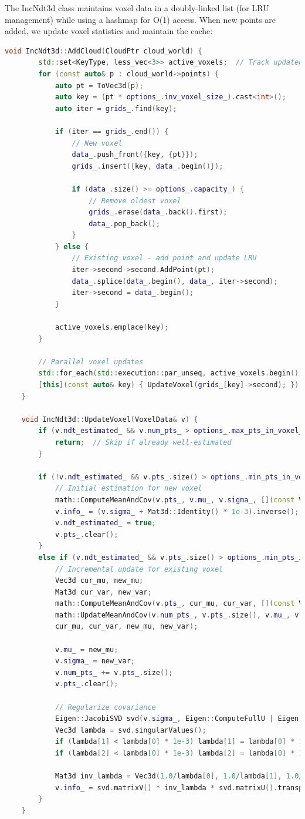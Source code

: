 The IncNdt3d class maintains voxel data in a doubly-linked list (for LRU management) while using a hashmap for O(1) access. When new points are added, we update voxel statistics and maintain the cache:

\begin{lstlisting}[language=c++,caption=src/ch7/ndt\_inc.cc]
	void IncNdt3d::AddCloud(CloudPtr cloud_world) {
		std::set<KeyType, less_vec<3>> active_voxels;  // Track updated voxels
		for (const auto& p : cloud_world->points) {
			auto pt = ToVec3d(p);
			auto key = (pt * options_.inv_voxel_size_).cast<int>();
			auto iter = grids_.find(key);
			
			if (iter == grids_.end()) {
				// New voxel
				data_.push_front({key, {pt}});
				grids_.insert({key, data_.begin()});
				
				if (data_.size() >= options_.capacity_) {
					// Remove oldest voxel
					grids_.erase(data_.back().first);
					data_.pop_back();
				}
			} else {
				// Existing voxel - add point and update LRU
				iter->second->second.AddPoint(pt);
				data_.splice(data_.begin(), data_, iter->second);
				iter->second = data_.begin();
			}
			
			active_voxels.emplace(key);
		}
		
		// Parallel voxel updates
		std::for_each(std::execution::par_unseq, active_voxels.begin(), active_voxels.end(),
		[this](const auto& key) { UpdateVoxel(grids_[key]->second); });
	}
	
	void IncNdt3d::UpdateVoxel(VoxelData& v) {
		if (v.ndt_estimated_ && v.num_pts_ > options_.max_pts_in_voxel_) {
			return;  // Skip if already well-estimated
		}
		
		if (!v.ndt_estimated_ && v.pts_.size() > options_.min_pts_in_voxel_) {
			// Initial estimation for new voxel
			math::ComputeMeanAndCov(v.pts_, v.mu_, v.sigma_, [](const Vec3d& p) { return p; });
			v.info_ = (v.sigma_ + Mat3d::Identity() * 1e-3).inverse();
			v.ndt_estimated_ = true;
			v.pts_.clear();
		} 
		else if (v.ndt_estimated_ && v.pts_.size() > options_.min_pts_in_voxel_) {
			// Incremental update for existing voxel
			Vec3d cur_mu, new_mu;
			Mat3d cur_var, new_var;
			math::ComputeMeanAndCov(v.pts_, cur_mu, cur_var, [](const Vec3d& p) { return p; });
			math::UpdateMeanAndCov(v.num_pts_, v.pts_.size(), v.mu_, v.sigma_, 
			cur_mu, cur_var, new_mu, new_var);
			
			v.mu_ = new_mu;
			v.sigma_ = new_var;
			v.num_pts_ += v.pts_.size();
			v.pts_.clear();
			
			// Regularize covariance
			Eigen::JacobiSVD svd(v.sigma_, Eigen::ComputeFullU | Eigen::ComputeFullV);
			Vec3d lambda = svd.singularValues();
			if (lambda[1] < lambda[0] * 1e-3) lambda[1] = lambda[0] * 1e-3;
			if (lambda[2] < lambda[0] * 1e-3) lambda[2] = lambda[0] * 1e-3;
			
			Mat3d inv_lambda = Vec3d(1.0/lambda[0], 1.0/lambda[1], 1.0/lambda[2]).asDiagonal();
			v.info_ = svd.matrixV() * inv_lambda * svd.matrixU().transpose();
		}
	}
\end{lstlisting}

